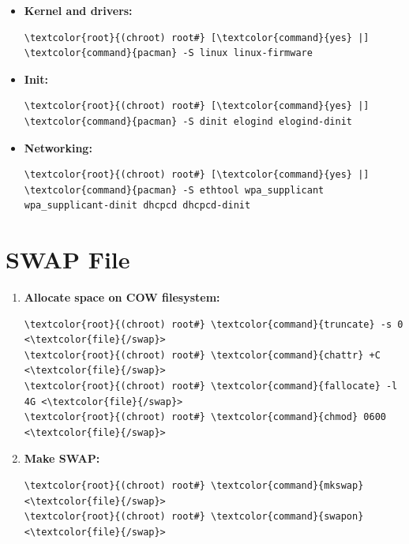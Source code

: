 \documentclass[10pt, a4paper, onecolumn, oneside, titlepage, openany]{book}
\begin{document}
\begin{itemize}
\begin{Verbatim}[commandchars=\\\{\}]
\textcolor{root}{(chroot) root#} [\textcolor{command}{yes} |] \textcolor{command}{pacman} -S intel-ucode
\end{Verbatim}
    \item \textbf{Kernel and drivers:}
\begin{Verbatim}[commandchars=\\\{\}]
\textcolor{root}{(chroot) root#} [\textcolor{command}{yes} |] \textcolor{command}{pacman} -S linux linux-firmware
\end{Verbatim}
    \item \textbf{Init:}
\begin{Verbatim}[commandchars=\\\{\}]
\textcolor{root}{(chroot) root#} [\textcolor{command}{yes} |] \textcolor{command}{pacman} -S dinit elogind elogind-dinit
\end{Verbatim}
    \item \textbf{Networking:}
\begin{Verbatim}[commandchars=\\\{\}]
\textcolor{root}{(chroot) root#} [\textcolor{command}{yes} |] \textcolor{command}{pacman} -S ethtool wpa_supplicant
wpa_supplicant-dinit dhcpcd dhcpcd-dinit
\end{Verbatim}
\end{itemize}

\section{SWAP File}
\begin{enumerate}
    \item \textbf{Allocate space on COW filesystem:}
\begin{Verbatim}[commandchars=\\\{\}]
\textcolor{root}{(chroot) root#} \textcolor{command}{truncate} -s 0 <\textcolor{file}{/swap}>
\textcolor{root}{(chroot) root#} \textcolor{command}{chattr} +C <\textcolor{file}{/swap}>
\textcolor{root}{(chroot) root#} \textcolor{command}{fallocate} -l 4G <\textcolor{file}{/swap}>
\textcolor{root}{(chroot) root#} \textcolor{command}{chmod} 0600 <\textcolor{file}{/swap}>
\end{Verbatim}
    \item \textbf{Make SWAP:}
\begin{Verbatim}[commandchars=\\\{\}]
\textcolor{root}{(chroot) root#} \textcolor{command}{mkswap} <\textcolor{file}{/swap}>
\textcolor{root}{(chroot) root#} \textcolor{command}{swapon} <\textcolor{file}{/swap}>
\end{Verbatim}
\end{enumerate}
\end{document}
